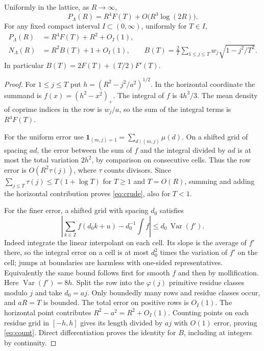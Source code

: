 \documentclass[11pt]{article}
\newcommand{\Z}{\mathbb Z}\newcommand{\R}{\mathbb R}\newcommand{\E}{\mathcal E}
\begin{document}
\begin{lemma}\label{lem:count}
Uniformly in the lattice, as $R\to\infty$,
\begin{equation}
 P_\Lambda(R)=R^4 F(T)+O\bigl(R^3\log(2R)\bigr).\label{eq:crude}
\end{equation}
For any fixed compact interval $I\subset(0,\infty)$, uniformly for $T\in I$,
\begin{align}
 P_\Lambda(R)&=R^4F(T)+R^2+O_I(1),\label{eq:sharp}\\
 N_\Lambda(R)&=R^2 B(T)+1+O_I(1),\qquad
 B(T)=\frac2T\sum_{1\le j\le T}w_j\sqrt{1-j^2/T^2}.
 \label{eq:count}
\end{align}
In particular $B(T)=2F(T)+(T/2)F'(T)$.
\end{lemma}
\begin{proof}
For $1\le j\le T$ put $h=(R^2-j^2/a^2)^{1/2}$. In the horizontal coordinate the summand is $f(x)=(h^2-x^2)_+$. The integral of $f$ is $4h^3/3$. The mean density of coprime indices in the row is $w_j/a$, so the sum of the integral terms is $R^4F(T)$.

For the uniform error use $\mathbf1_{(m,j)=1}=\sum_{d\mid(m,j)}\mu(d)$. On a shifted grid of spacing $ad$, the error between the sum of $f$ and the integral divided by $ad$ is at most the total variation $2h^2$, by comparison on consecutive cells. Thus the row error is $O(R^2\tau(j))$, where $\tau$ counts divisors. Since $\sum_{j\le T}\tau(j)\le T(1+\log T)$ for $T\ge1$ and $T=O(R)$, summing and adding the horizontal contribution proves \eqref{eq:crude}, also for $T<1$.

For the finer error, a shifted grid with spacing $d_0$ satisfies
\[
 \left|\sum_{k\in\Z} f(d_0 k+u)-d_0^{-1}\int f\right|
 \le d_0\,\operatorname{Var}(f').
\]
Indeed integrate the linear interpolant on each cell. Its slope is the average of $f'$ there, so the integral error on a cell is at most $d_0^2$ times the variation of $f'$ on the cell; jumps at boundaries are harmless with one-sided representatives. Equivalently the same bound follows first for smooth $f$ and then by mollification. Here $\operatorname{Var}(f')=8h$. Split the row into the $\varphi(j)$ primitive residue classes modulo $j$ and take $d_0=aj$. Only boundedly many rows and residue classes occur, and $aR=T$ is bounded. The total error on positive rows is $O_I(1)$. The horizontal point contributes $R^2-a^2=R^2+O_I(1)$. Counting points on each residue grid in $[-h,h]$ gives its length divided by $aj$ with $O(1)$ error, proving \eqref{eq:count}. Direct differentiation proves the identity for $B$, including at integers by continuity.
\end{proof}
\end{document}

